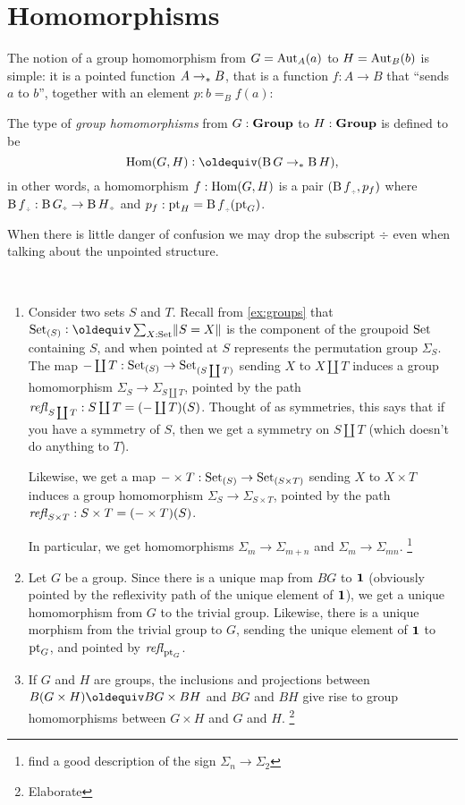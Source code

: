 \section{Homomorphisms}
\label{sec:homomorphisms}


The notion of a group homomorphism from $G=\mathrm{Aut}_A(a)$ to $H=\mathrm{Aut}_B(b)$
is simple: it is a pointed function $A\to_\ast B$, that is a function
$f:A\to B$ that ``sends $a$ to $b$'', \ie together with an element
$p:b=_Bf(a)$:
\begin{definition}\label{def:grouphomomorphism}
  The type of \emph{group homomorphisms} from $G:\mathbf{Group}$ to
  $H:\mathbf{Group}$ is defined to be
  $$\Hom(G,H)\defequi(\clf G\ptdto \clf H),
$$
in other words, a homomorphism $f:\mathrm{Hom}(G,H)$ is a pair $({\clf f}_\div,p_f)$ where ${\clf f}_\div:{\clf G}_\div\to {\clf H}_\div$ and $p_f:\pt_H={\clf f}_\div(\pt_G)$.
\end{definition}
When there is little danger of confusion we may drop the subscript
$\div$ even when talking about the unpointed structure.
\begin{example}%
  \label{ex:groups-morphisms}%
  ~%
  \begin{enumerate}
  \item Consider two sets $S$ and $T$.  Recall from \cref{ex:groups}
    that $\Set_{(S)}\defequi\sum_{X:\Set}\Trunc{S=X}$ is the component
    of the groupoid $\mathord{\mathrm{Set}}$ containing $S$, and when pointed at $S$
    represents the permutation group $\Sigma_S$.  The map
    ${-}\coprod T:\mathord{\mathrm{Set}}_{(S)}\to\mathord{\mathrm{Set}}_{(S\coprod T)}$ sending $X$ to $X\coprod T$
    induces a group homomorphism $\Sigma_S\to\Sigma_{S\coprod T}$,
    pointed by the path $\mathop{\mathit{refl}_{S\coprod T}}:S\coprod T = ({-}\coprod T)(S)$.
    Thought of as symmetries, this says that if you have a symmetry of
    $S$, then we get a symmetry on $S\coprod T$ (which doesn't do
    anything to $T$).

    Likewise, we get a map
    ${-}\times T:\mathord{\mathrm{Set}}_{(S)}\to\mathord{\mathrm{Set}}_{(S\times T)}$ sending $X$ to
    $X\times T$ induces a group homomorphism
    $\Sigma_S\to\Sigma_{S\times T}$, pointed by the path
    $\mathop{\mathit{refl}_{S\times T}}: {S\times T} = ({-} \times T)(S)$.

In particular, we get homomorphisms $\Sigma_m\to\Sigma_{m+n}$ and $\Sigma_m\to\Sigma_{mn}$. \footnote{find a good description of the sign $\Sigma_n\to\Sigma_2$}
\item Let $G$ be a group.  Since there is a unique map from $BG$ to
  $\mathbf{1} $ (obviously pointed by the reflexivity path of the unique
  element of $\mathbf{1}$), we get a unique homomorphism from $G$ to the
  trivial group.  Likewise, there is a unique morphism from the
  trivial group to $G$, sending the unique element of $\mathbf{1}$ to
  $\mathrm{pt}_G$, and pointed by $\mathop{\mathit{refl}_{\mathrm{pt}_G}}$.
\item If $G$ and $H$ are groups, the inclusions and projections between $B(G\times H)\oldequiv BG\times BH$ and $BG$ and $BH$ give rise to group homomorphisms between $G\times H$ and $G$ and $H$.  \footnote{Elaborate}
  \end{enumerate}
\end{example}

